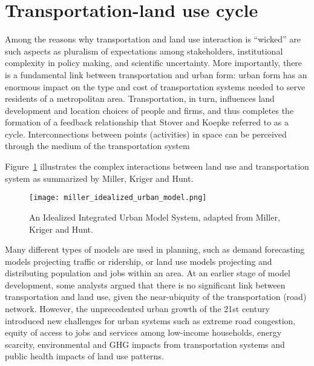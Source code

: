 \section{Transportation-land use cycle} \label{sec:transportation_land_use_cycle}

Among the reasons why transportation and land use interaction is ``wicked'' are such aspects as pluralism of expectations among stakeholders, institutional complexity in policy making, and scientific uncertainty\cite{Noto2015}.
More importantly, there is a fundamental link between transportation and urban form: urban form has an enormous impact on the type and cost of transportation systems needed to serve residents of a metropolitan area\cite{Kelly1994}.
Transportation, in turn, influences land development and location choices of people and firms, and thus completes the formation of a feedback relationship that Stover and Koepke\cite{Stover1988} referred to as a cycle.
Interconnections between points (activities) in space can be perceived through the medium of the transportation system\cite{Miller1998}

Figure~\ref{fig:idealized_integrated_urban_model} illustrates the complex interactions between land use and transportation system as summarized by Miller, Kriger and Hunt\cite{Miller1998}.

\begin{figure}[hbt!]
    \centering
    \texttt{[image: miller\_idealized\_urban\_model.png]}
    \caption{An Idealized Integrated Urban Model System, adapted from Miller, Kriger and Hunt\cite{Miller1998}.}
    \label{fig:idealized_integrated_urban_model}
\end{figure}

Many different types of models are used in planning, such as demand forecasting models projecting traffic or ridership, or land use models projecting and distributing population and jobs within an area.
At an earlier stage of model development, some analysts argued that there is no significant link between transportation and land use, given the near-ubiquity of the transportation (road) network\cite{Miller1998}.
However, the unprecedented urban growth of the 21st century introduced new challenges for urban systems such as extreme road congestion, equity of access to jobs and services among low-income households, energy scarcity, environmental and GHG impacts from transportation systems and public health impacts of land use patterns\cite{Miller2018b,Moeckel2017}.

